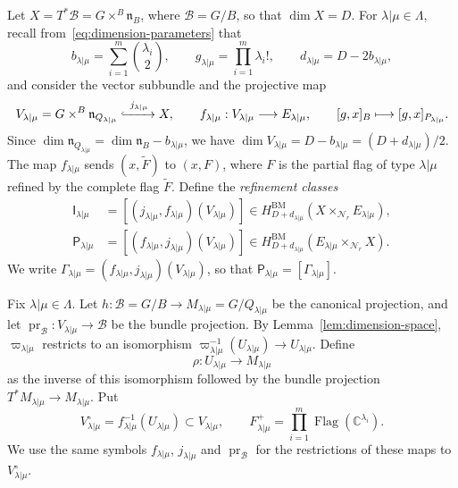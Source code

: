 \documentclass[11pt,a4paper]{amsart}
\theoremstyle{definition}
\theoremstyle{remark}
\newcommand{\C}{\mathbb C}
\newcommand{\N}{\mathcal N}
\newcommand{\B}{\mathcal B}
\newcommand{\BM}{\mathrm{BM}}
\newcommand{\Flag}{\operatorname{Flag}}
\newcommand{\pr}{\operatorname{pr}}
\newcommand{\lm}{\lambda|\mu}
\numberwithin{equation}{section}
\begin{document}
Let $X=T^*\B=G\times^B\mathfrak n_B$, where $\B=G/B$, so that
$\dim X=D$. For $\lm\in\Lambda$, recall
from~\eqref{eq:dimension-parameters} that
$$
b_{\lm}=\sum_{i=1}^m\binom{\lambda_i}{2},\qquad
g_{\lm}=\prod_{i=1}^m\lambda_i!,\qquad
d_{\lm}=D-2b_{\lm},
$$
and consider the vector subbundle and the projective map
$$
V_{\lm}=G\times^B\mathfrak n_{Q_{\lm}}\xhookrightarrow{\ j_{\lm}\ }X,
\qquad
f_{\lm}:V_{\lm}\longrightarrow E_{\lm},\qquad
[g,x]_B\longmapsto[g,x]_{P_{\lm}}.
$$
Since $\dim\mathfrak n_{Q_{\lm}}=\dim\mathfrak n_B-b_{\lm}$, we have
$\dim V_{\lm}=D-b_{\lm}=(D+d_{\lm})/2$. The map $f_{\lm}$ sends
$(x,\widetilde F)$ to $(x,F)$, where $F$ is the partial flag of type $\lm$
refined by the complete flag $\widetilde F$. Define the \textit{refinement classes}
$$
\begin{aligned}
\mathsf I_{\lm}&=[(j_{\lm},f_{\lm})(V_{\lm})]
\in H^{\BM}_{D+d_{\lm}}(X\times_{\N_r}E_{\lm}),\\
\mathsf P_{\lm}&=[(f_{\lm},j_{\lm})(V_{\lm})]
\in H^{\BM}_{D+d_{\lm}}(E_{\lm}\times_{\N_r}X).
\end{aligned}
$$
We write $\Gamma_{\lm}=(f_{\lm},j_{\lm})(V_{\lm})$, so that
$\mathsf P_{\lm}=[\Gamma_{\lm}]$.

Fix $\lm\in\Lambda$. Let $h:\B=G/B\to M_{\lm}=G/Q_{\lm}$ be the canonical
projection, and let $\pr_\B:V_{\lm}\to\B$ be the bundle projection. By
Lemma~\ref{lem:dimension-space}, $\varpi_{\lm}$ restricts to an
isomorphism $\varpi_{\lm}^{-1}(U_{\lm})\to U_{\lm}$. Define
$$
\rho:U_{\lm}\longrightarrow M_{\lm}
$$
as the inverse of this isomorphism followed by the bundle projection
$T^*M_{\lm}\to M_{\lm}$. Put
$$
V^\circ_{\lm}=f_{\lm}^{-1}(U_{\lm})\subset V_{\lm},\qquad
F_{\lm}^+=\prod_{i=1}^m\Flag(\C^{\lambda_i}).
$$
We use the same symbols $f_{\lm}$, $j_{\lm}$ and $\pr_\B$ for the
restrictions of these maps to $V^\circ_{\lm}$.
\end{document}
